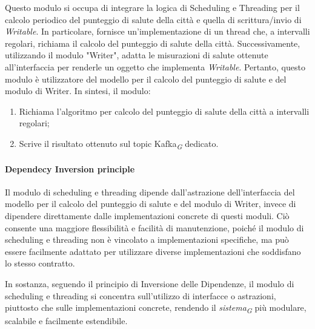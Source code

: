 Questo modulo si occupa di integrare la logica di Scheduling e Threading per il calcolo periodico del punteggio di salute della città e quella di scrittura/invio di \textit{Writable}. In particolare, fornisce un'implementazione di un thread che, a intervalli regolari, richiama il calcolo del punteggio di salute della città. Successivamente, utilizzando il modulo "Writer", adatta le misurazioni di salute ottenute all'interfaccia per renderle un oggetto che implementa \textit{Writable}. Pertanto, questo modulo è utilizzatore del modello per il calcolo del punteggio di salute e del modulo di Writer.
In sintesi, il modulo:
    \begin{enumerate}
        \item Richiama l'algoritmo per calcolo del punteggio di salute della città a intervalli regolari;
        \item Scrive il risultato ottenuto sul topic Kafka\textsubscript{\textit{G}} dedicato.
    \end{enumerate}

\paragraph*{Dependecy Inversion principle}
Il modulo di scheduling e threading dipende dall'astrazione dell'interfaccia del modello per il calcolo del punteggio di salute e del modulo di Writer, invece di dipendere direttamente dalle implementazioni concrete di questi moduli. Ciò consente una maggiore flessibilità e facilità di manutenzione, poiché il modulo di scheduling e threading non è vincolato a implementazioni specifiche, ma può essere facilmente adattato per utilizzare diverse implementazioni che soddisfano lo stesso contratto.

In sostanza, seguendo il principio di Inversione delle Dipendenze, il modulo di scheduling e threading si concentra sull'utilizzo di interfacce o astrazioni, piuttosto che sulle implementazioni concrete, rendendo il \textit{sistema}\textsubscript{\textit{G}} più modulare, scalabile e facilmente estendibile.


